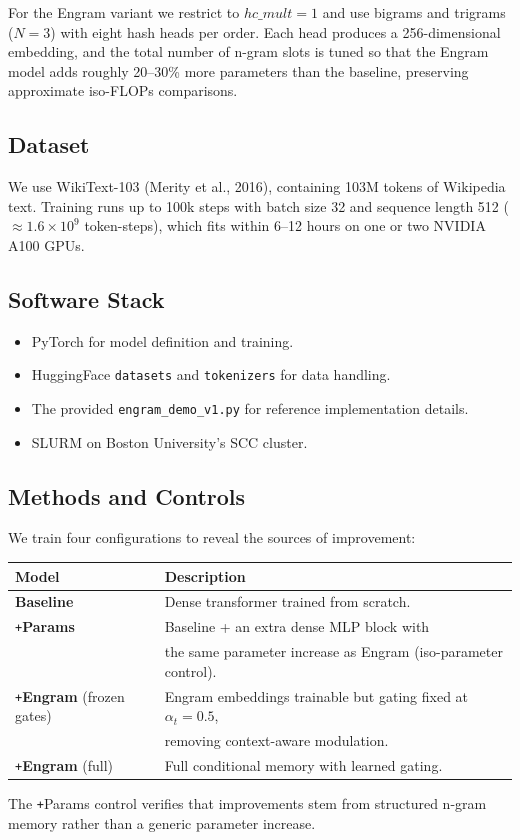 \documentclass[11pt]{article}
\begin{document}
For the Engram variant we restrict to $hc\_mult = 1$ and use bigrams and trigrams ($N=3$) with eight hash heads per order. Each head produces a 256-dimensional embedding, and the total number of n-gram slots is tuned so that the Engram model adds roughly 20--30\% more parameters than the baseline, preserving approximate iso-FLOPs comparisons.

\subsection{Dataset}
We use WikiText-103 (Merity et al., 2016), containing 103M tokens of Wikipedia text. Training runs up to 100k steps with batch size 32 and sequence length 512 (\(\approx 1.6\times10^9\) token-steps), which fits within 6--12 hours on one or two NVIDIA A100 GPUs.

\subsection{Software Stack}
\begin{itemize}
    \item PyTorch for model definition and training.
    \item HuggingFace \texttt{datasets} and \texttt{tokenizers} for data handling.
    \item The provided \texttt{engram\_demo\_v1.py} for reference implementation details.
    \item SLURM on Boston University's SCC cluster.
\end{itemize}

\subsection{Methods and Controls}
We train four configurations to reveal the sources of improvement:
\begin{center}
\begin{tabular}{ll}
\toprule
Model & Description \\
\midrule
\textbf{Baseline} & Dense transformer trained from scratch. \\
\texttt{+}\textbf{Params} & Baseline + an extra dense MLP block with \\
                & the same parameter increase as Engram (iso-parameter control). \\
\texttt{+}\textbf{Engram} (frozen gates) & Engram embeddings trainable but gating fixed at $\alpha_t = 0.5$, \\
                                        & removing context-aware modulation. \\
\texttt{+}\textbf{Engram} (full) & Full conditional memory with learned gating. \\
\bottomrule
\end{tabular}
\end{center}
The \texttt{+}Params control verifies that improvements stem from structured n-gram memory rather than a generic parameter increase.
\end{document}
